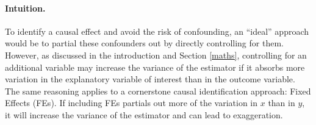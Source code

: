 \documentclass[usletter, 12pt]{article}
\begin{document}
     			\paragraph{Intuition.} To identify a causal effect and avoid the risk of confounding, an ``ideal'' approach would be to partial these confounders out by directly controlling for them. %
			However, as discussed in the introduction and Section \ref{maths}, controlling for an additional variable may increase the variance of the estimator if it absorbs more variation in the explanatory variable of interest than in the outcome variable.
			The same reasoning applies to a cornerstone causal identification approach: Fixed Effects (FEs). If including FEs partials out more of the variation in $x$ than in $y$, it will increase the variance of the estimator and can lead to exaggeration. 
			
\end{document}
